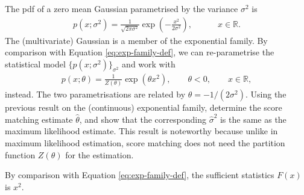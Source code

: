 \begin{exenumerate}
    
\item The pdf of a zero mean Gaussian parametrised by the variance $\sigma^2$ is 
  \begin{align}
    p(x; \sigma^2) = \frac{1}{\sqrt{2 \pi \sigma^2}}\exp\left(-\frac{x^2}{2\sigma^2} \right), \quad \quad \quad x \in \mathbb{R}.
  \end{align}
  The (multivariate) Gaussian is a member of the exponential
  family. By comparison with Equation \eqref{eq:exp-family-def}, we
  can re-parametrise the statistical model $\{p(x; \sigma^2)\}_{\sigma^2}$ and work with
  \begin{align}
    p(x; \theta) = \frac{1}{Z(\theta)}\exp\left(\theta x^2 \right), \quad \quad \theta <0, \quad \quad x \in \mathbb{R},
  \end{align}
  instead. The two parametrisations are related by $\theta =
  -1/(2 \sigma^2)$. Using the previous result on the (continuous)
  exponential family, determine the score matching estimate
  $\hat{\theta}$, and show that the corresponding $\hat{\sigma}^2$ is
  the same as the maximum likelihood estimate. This result is
  noteworthy because unlike in maximum likelihood estimation, score
  matching does not need the partition function $Z(\theta)$ for the estimation.

  \begin{solution}
    By comparison with Equation \eqref{eq:exp-family-def}, the
    sufficient statistics $F(x)$ is $x^2$.


\end{solution}
\end{exenumerate}
